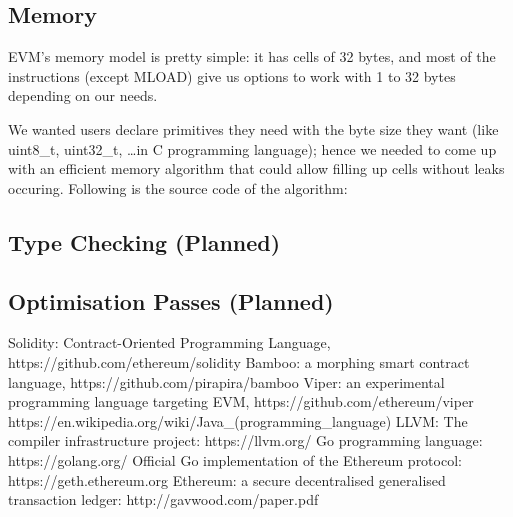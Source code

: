 \documentclass{article}
\begin{document}
\subsection{Memory}
\label{subsec:memory}
\par EVM's memory model is pretty simple: it has cells of 32 bytes, and most of the instructions (except MLOAD) give us options to work with 1 to 32 bytes depending on our needs.
\par We wanted users declare primitives they need with the byte size they want (like uint8\_t, uint32\_t, \ldots in C programming language); hence we needed to come up with an efficient memory algorithm that could allow filling up cells without leaks occuring. Following is the source code of the algorithm:


\subsection{Type Checking (Planned)}
\label{subsec:type_checking}
\subsection{Optimisation Passes (Planned)}
\label{subsec:optimisation_passes}
\newpage
\begin{thebibliography}{9}
  Solidity: Contract-Oriented Programming Language, https://github.com/ethereum/solidity
  Bamboo: a morphing smart contract language, https://github.com/pirapira/bamboo
  Viper: an experimental programming language targeting EVM, https://github.com/ethereum/viper
  https://en.wikipedia.org/wiki/Java\_(programming\_language)
  LLVM: The compiler infrastructure project: https://llvm.org/
  Go programming language: https://golang.org/
  Official Go implementation of the Ethereum protocol: https://geth.ethereum.org
  Ethereum: a secure decentralised generalised transaction ledger: http://gavwood.com/paper.pdf

\end{thebibliography}
\end{document}
